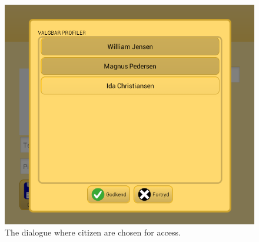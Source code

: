\begin{figure}
\includegraphics[scale=0.5]{media/sprint4/save_dialog3}
\caption{The dialogue where citizen are chosen for access.}
\label{fig:save3}
\end{figure}
